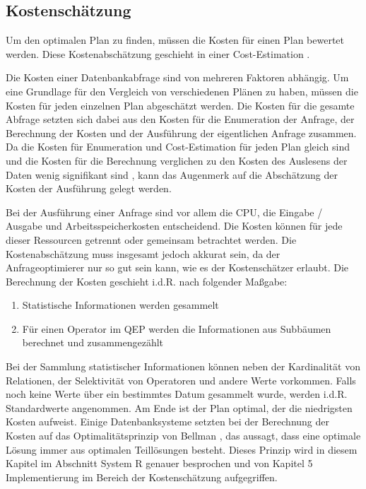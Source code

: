 \subsection{Kostenschätzung}

Um den optimalen Plan zu finden, müssen die Kosten für einen Plan bewertet werden. Diese Kostenabschätzung geschieht in einer Cost-Estimation \cite{bruno2011automated}. 

Die Kosten einer Datenbankabfrage sind von mehreren Faktoren abhängig. Um eine Grundlage für den Vergleich von verschiedenen Plänen zu haben, müssen die Kosten für jeden einzelnen Plan abgeschätzt werden. Die Kosten für die gesamte Abfrage setzten sich dabei aus den Kosten für die Enumeration der Anfrage, der Berechnung der Kosten und der Ausführung der eigentlichen Anfrage zusammen. Da die Kosten für Enumeration und Cost-Estimation für jeden Plan gleich sind und die Kosten für die Berechnung verglichen zu den Kosten des Auslesens der Daten wenig signifikant sind \cite{selinger1979access}, kann das Augenmerk auf die Abschätzung der Kosten der Ausführung gelegt werden.

Bei der Ausführung einer Anfrage sind vor allem die CPU, die Eingabe / Ausgabe und Arbeitsspeicherkosten entscheidend. Die Kosten können für jede dieser Ressourcen getrennt oder gemeinsam betrachtet werden. Die Kostenabschätzung muss insgesamt jedoch akkurat sein, da der Anfrageoptimierer nur so gut sein kann, wie es der Kostenschätzer erlaubt. Die Berechnung der Kosten geschieht i.d.R. nach folgender Maßgabe:

\begin{enumerate}
\item Statistische Informationen werden gesammelt
\item Für einen Operator im \ac{QEP} werden die Informationen aus Subbäumen berechnet und zusammengezählt
\end{enumerate}

Bei der Sammlung statistischer Informationen können neben der Kardinalität von Relationen, der Selektivität von Operatoren und andere Werte vorkommen. Falls noch keine Werte über ein bestimmtes Datum gesammelt wurde, werden i.d.R. Standardwerte angenommen. Am Ende ist der Plan optimal, der die niedrigsten Kosten aufweist. Einige Datenbanksysteme setzten bei der Berechnung der Kosten auf das Optimalitätsprinzip von Bellman \cite{Bellman:1957}, das aussagt, dass eine optimale Lösung immer aus optimalen Teillösungen besteht. Dieses Prinzip wird in diesem Kapitel im Abschnitt System R genauer besprochen und von Kapitel 5 Implementierung im Bereich der Kostenschätzung aufgegriffen.